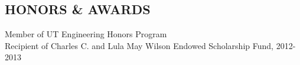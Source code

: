 \documentclass[line,margin]{res}
\begin{document}
\begin{resume}
                         \section{HONORS \& AWARDS}
                         Member of UT Engineering Honors Program \\
                         Recipient of Charles C. and Lula May Wilson Endowed Scholarship Fund, 2012-2013
                         
                 
\iffalse             
\section{EXTRA-CURRICULAR \\ ACTIVITIES}             
            Elected {\it House Manager}, Rho Phi Sorority \\
            Elected {\it Sports Chairman} \\
            Attended Krannet Leadership Conference \\
                Headed delegation to Rho Phi Congress \\
                Junior varsity basketball team \\
                Participant, seven intramural athletic teams 
 \fi

\end{resume}
\end{document}
